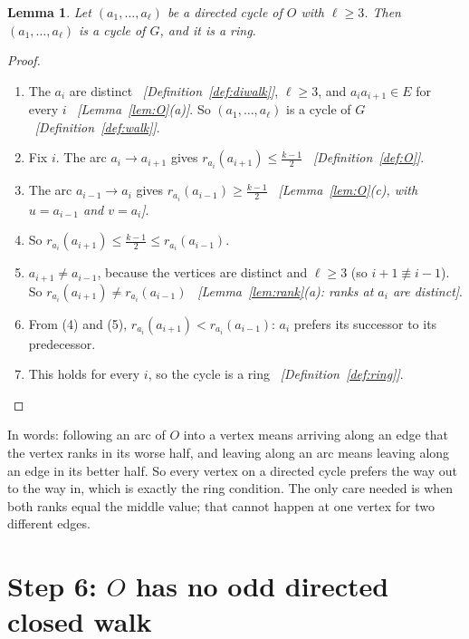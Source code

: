 \documentclass[11pt]{article}
\theoremstyle{plain}
\newtheorem{lemma}[theorem]{Lemma}
\theoremstyle{definition}
\theoremstyle{remark}
\newcommand{\half}{\tfrac{k-1}{2}}
\newcommand{\why}[1]{\unskip\ \textit{[#1]}}
\newenvironment{steps}{\begin{enumerate}[label=(\arabic*),leftmargin=2.2em,itemsep=0.35em]}{\end{enumerate}}
\begin{document}
\begin{lemma}\label{lem:dicycle-ring}
Let $(a_1,\dots,a_\ell)$ be a directed cycle of $O$ with $\ell\ge 3$. Then $(a_1,\dots,a_\ell)$
is a cycle of $G$, and it is a ring.
\end{lemma}

\begin{proof}
\begin{steps}
  \item The $a_i$ are distinct \why{Definition~\ref{def:diwalk}}, $\ell\ge 3$, and
    $a_ia_{i+1}\in E$ for every $i$ \why{Lemma~\ref{lem:O}(a)}. So $(a_1,\dots,a_\ell)$ is a cycle
    of $G$ \why{Definition~\ref{def:walk}}.
  \item Fix $i$. The arc $a_i\to a_{i+1}$ gives $r_{a_i}(a_{i+1})\le\half$
    \why{Definition~\ref{def:O}}.
  \item The arc $a_{i-1}\to a_i$ gives $r_{a_i}(a_{i-1})\ge\half$
    \why{Lemma~\ref{lem:O}(c), with $u=a_{i-1}$ and $v=a_i$}.
  \item So $r_{a_i}(a_{i+1})\le\half\le r_{a_i}(a_{i-1})$.
  \item $a_{i+1}\ne a_{i-1}$, because the vertices are distinct and $\ell\ge 3$ (so
    $i+1\not\equiv i-1$). So $r_{a_i}(a_{i+1})\ne r_{a_i}(a_{i-1})$
    \why{Lemma~\ref{lem:rank}(a): ranks at $a_i$ are distinct}.
  \item From (4) and (5), $r_{a_i}(a_{i+1})<r_{a_i}(a_{i-1})$: $a_i$ prefers its successor to its
    predecessor.
  \item This holds for every $i$, so the cycle is a ring \why{Definition~\ref{def:ring}}.
    \qedhere
\end{steps}
\end{proof}

In words: following an arc of $O$ into a vertex means arriving along an edge that the vertex
ranks in its worse half, and leaving along an arc means leaving along an edge in its better half.
So every vertex on a directed cycle prefers the way out to the way in, which is exactly the ring
condition. The only care needed is when both ranks equal the middle value; that cannot happen at
one vertex for two different edges.

\section{Step 6: \texorpdfstring{$O$}{O} has no odd directed closed walk}\label{sec:step6}
\end{document}
